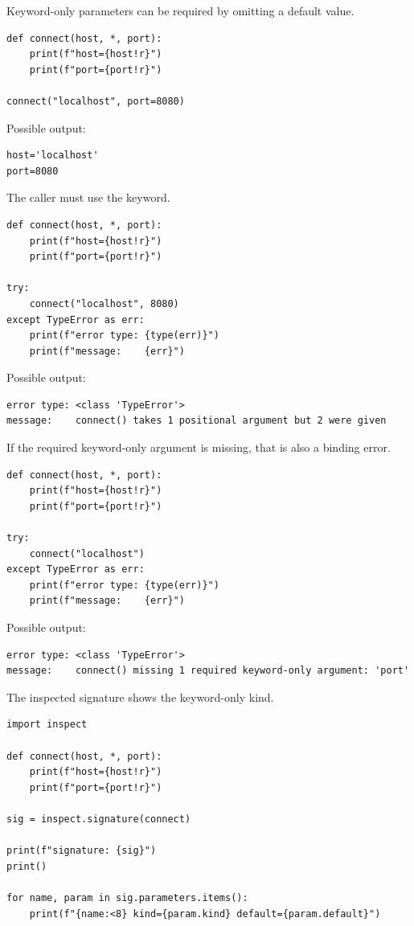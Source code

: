 Keyword-only parameters can be required by omitting a default value.

\begin{verbatim}
def connect(host, *, port):
    print(f"host={host!r}")
    print(f"port={port!r}")

connect("localhost", port=8080)
\end{verbatim}

Possible output:

\begin{verbatim}
host='localhost'
port=8080
\end{verbatim}

The caller must use the keyword.

\begin{verbatim}
def connect(host, *, port):
    print(f"host={host!r}")
    print(f"port={port!r}")

try:
    connect("localhost", 8080)
except TypeError as err:
    print(f"error type: {type(err)}")
    print(f"message:    {err}")
\end{verbatim}

Possible output:

\begin{verbatim}
error type: <class 'TypeError'>
message:    connect() takes 1 positional argument but 2 were given
\end{verbatim}

If the required keyword-only argument is missing, that is also a binding error.

\begin{verbatim}
def connect(host, *, port):
    print(f"host={host!r}")
    print(f"port={port!r}")

try:
    connect("localhost")
except TypeError as err:
    print(f"error type: {type(err)}")
    print(f"message:    {err}")
\end{verbatim}

Possible output:

\begin{verbatim}
error type: <class 'TypeError'>
message:    connect() missing 1 required keyword-only argument: 'port'
\end{verbatim}

The inspected signature shows the keyword-only kind.

\begin{verbatim}
import inspect

def connect(host, *, port):
    print(f"host={host!r}")
    print(f"port={port!r}")

sig = inspect.signature(connect)

print(f"signature: {sig}")
print()

for name, param in sig.parameters.items():
    print(f"{name:<8} kind={param.kind} default={param.default}")
\end{verbatim}

